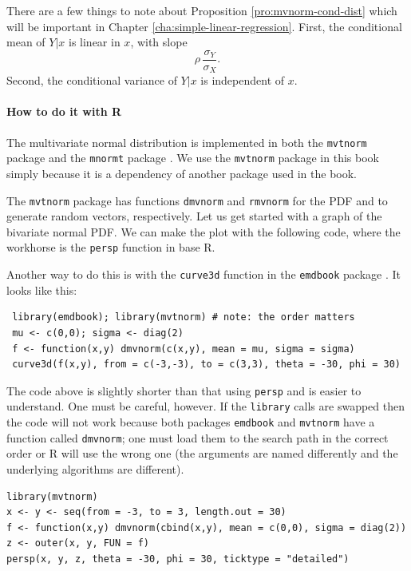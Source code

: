 \documentclass[captions=tableheading]{scrbook}
\begin{document}
There are a few things to note about Proposition \ref{pro:mvnorm-cond-dist} which will be important in Chapter \ref{cha:simple-linear-regression}. First, the conditional mean of \(Y|x\) is linear in \(x\), with slope
\begin{equation}
\rho\,\frac{\sigma_{Y}}{\sigma_{X}}.\label{eq:population-slope-slr}
\end{equation}
Second, the conditional variance of \(Y|x\) is independent of \(x\). 

\paragraph*{How to do it with \textsf{R}}

The multivariate normal distribution is implemented in both the \texttt{mvtnorm} package \cite{Genzmvtnorm} and the \texttt{mnormt} package \cite{mnormt}. We use the \texttt{mvtnorm} package in this book simply because it is a dependency of another package used in the book. 

The \texttt{mvtnorm} package has functions \texttt{dmvnorm} and \texttt{rmvnorm} for the PDF and to generate random vectors, respectively. Let us get started with a graph of the bivariate normal PDF. We can make the plot with the following code, where the workhorse is the \texttt{persp} function in base \textsf{R}.

Another way to do this is with the \texttt{curve3d} function in the \texttt{emdbook} package \cite{emdbook}. It looks like this:
\begin{verbatim}
 library(emdbook); library(mvtnorm) # note: the order matters
 mu <- c(0,0); sigma <- diag(2)
 f <- function(x,y) dmvnorm(c(x,y), mean = mu, sigma = sigma)
 curve3d(f(x,y), from = c(-3,-3), to = c(3,3), theta = -30, phi = 30)
\end{verbatim}
The code above is slightly shorter than that using \texttt{persp} and is easier to understand. One must be careful, however. If the \texttt{library} calls are swapped then the code will not work because both packages \texttt{emdbook} and \texttt{mvtnorm} have a function called \texttt{dmvnorm}; one must load them to the search path in the correct order or \textsf{R} will use the wrong one (the arguments are named differently and the underlying algorithms are different).


\begin{verbatim}
library(mvtnorm)
x <- y <- seq(from = -3, to = 3, length.out = 30)
f <- function(x,y) dmvnorm(cbind(x,y), mean = c(0,0), sigma = diag(2))
z <- outer(x, y, FUN = f)
persp(x, y, z, theta = -30, phi = 30, ticktype = "detailed")
\end{verbatim}
\end{document}
